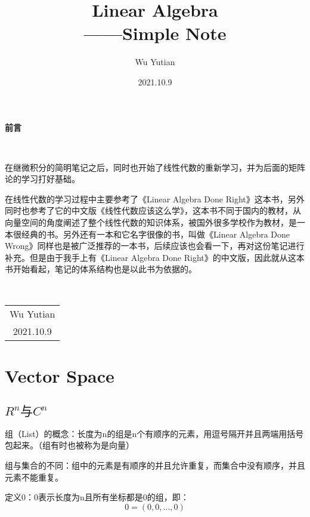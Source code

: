 \documentclass[11pt, b5paper, oneside]{book}
\title{{\Huge{\textbf{Linear Algebra }}}\\——Simple Note}
\author{Wu Yutian}
\date{2021.10.9}
\begin{document}
\maketitle

\setcounter{page}{1}

\begin{center}
    \Huge\textbf{前言}
\end{center}~\

在继微积分的简明笔记之后，同时也开始了线性代数的重新学习，并为后面的矩阵论的学习打好基础。

在线性代数的学习过程中主要参考了《Linear Algebra Done Right》这本书，另外同时也参考了它的中文版《线性代数应该这么学》，这本书不同于国内的教材，从向量空间的角度阐述了整个线性代数的知识体系，被国外很多学校作为教材，是一本很经典的书。另外还有一本和它名字很像的书，叫做《Linear Algebra Done Wrong》同样也是被广泛推荐的一本书，后续应该也会看一下，再对这份笔记进行补充。但是由于我手上有《Linear Algebra Done Right》的中文版，因此就从这本书开始看起，笔记的体系结构也是以此书为依据的。

~\\
\begin{flushright}
    \begin{tabular}{c}
        Wu Yutian\\
        2021.10.9
    \end{tabular}
\end{flushright}

\newpage
{}
\setcounter{page}{1}
\tableofcontents
\newpage
\setcounter{page}{1}

\chapter{Vector Space}

\section{$R^n \text{与} C^n$}

组（List）的概念：长度为n的组是n个有顺序的元素，用逗号隔开并且两端用括号包起来。（组有时也被称为是向量）

组与集合的不同：组中的元素是有顺序的并且允许重复，而集合中没有顺序，并且元素不能重复。

定义0：0表示长度为n且所有坐标都是0的组，即：\[0=(0,0,...,0)\]
\end{document}
